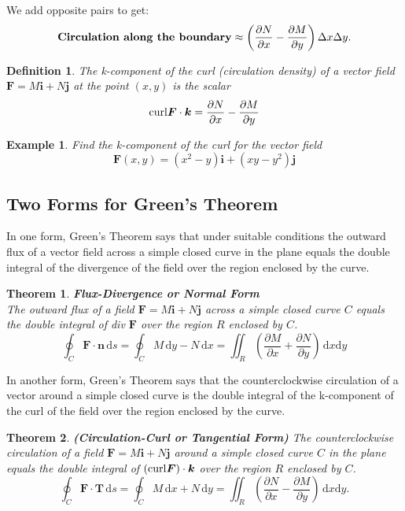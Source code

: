 \documentclass[a4paper,12pt]{article}
\newtheorem{example}{Example}             %
\newtheorem{theorem}{Theorem}[section]  %
\newtheorem{definition}{Definition}
\begin{document}
\begin{CJK}{UTF8}{gbsn}
We add opposite pairs to get:
\[
    {\rm \textbf{Circulation along the boundary}} \approx 
    \left(\frac{\partial N}{\partial x} - \frac{\partial M}{\partial y}\right)
    \Delta x\Delta y.
\]
\begin{definition}
    The k-component of the curl (circulation density) of a vector field 
    $\bm{F} = M\bm{i} + N\bm{j}$ at the point $(x,y)$ is the scalar 
    \[
        {\rm curl}\bm{F} \cdot \bm{k} = 
    \frac{\partial N}{\partial x} - \frac{\partial M}{\partial y}
\]
\end{definition}

\begin{example}
    Find the k-component of the curl for the vector field 
    \[
        \bm{F}(x,y) = (x^2 - y)\bm{i} + (xy - y^2)\bm{j}
    \]
\end{example}

\subsection{Two Forms for Green's Theorem}
In one form, Green's Theorem says that under suitable conditions the 
outward flux of a vector field across a simple closed curve in the 
plane equals the double integral of the divergence of the field 
over the region enclosed by the curve.
\begin{theorem}{\rm \textbf{Flux-Divergence or Normal Form}}\\
    The outward flux of a field $\bm{F} = M\bm{i}+N\bm{j}$ across a 
    simple closed curve $C$ equals the double integral of div $\bm{F}$
    over the region $R$ enclosed by $C$.
    \begin{equation}
        \oint_C\bm{F} \cdot \bm{n}\,\mathrm{d}s = 
        \oint_C M\,\mathrm{d}y - N\,\mathrm{d}x = 
        \iint_R \left(\frac{\partial M}{\partial x} + \frac{\partial N}{\partial y}\right)\,
        \mathrm{d}x\mathrm{d}y
        \label{eq:eq13}
    \end{equation}
\end{theorem}

In another form, Green's Theorem says that the counterclockwise circulation 
of a vector around a simple closed curve is the double integral of the 
k-component of the curl of the field over the region enclosed by the curve.

\begin{theorem}{\rm \textbf{(Circulation-Curl or Tangential Form)}}
    The counterclockwise circulation of a field $\bm{F} = M\bm{i}+N\bm{j}$
    around a simple closed curve $C$ in the plane equals the double integral 
    of $\left({\rm curl}\bm{F} \right) \cdot \bm{k}$ over the region $R$ enclosed 
    by $C$.
    \begin{equation}
        \oint_C \bm{F} \cdot \bm{T}\,\mathrm{d}s = \oint_C M\,\mathrm{d}x 
        + N\,\mathrm{d}y = \iint_R \left(\frac{\partial N}{\partial x} - \frac{\partial M}{\partial y}\right)
        \, \mathrm{d}x\mathrm{d}y.
        \label{eq:eq14}
    \end{equation}
\end{theorem}


\end{CJK}
\end{document}
